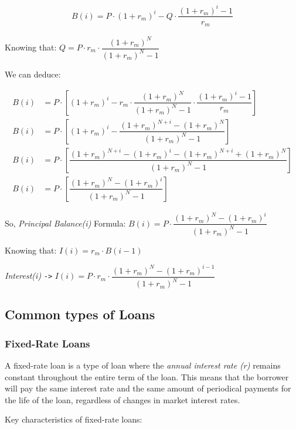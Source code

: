 \documentclass{article}
\begin{document}
\begin{align*}
B(i) = P \cdot (1+r_m)^i - Q \cdot \dfrac{(1+r_m)^i - 1}{r_m}
\end{align*}

Knowing that: $Q = P \cdot r_m \cdot \dfrac{(1+r_m)^N}{(1+r_m)^N-1}$

We can deduce:

\begin{align*}
B(i) &= P \cdot \left[(1+r_m)^i - r_m \cdot \dfrac{(1+r_m)^N}{(1+r_m)^N -1} \cdot
\dfrac{(1+r_m)^i -1}{r_m} \right] \\
B(i) &= P \cdot \left[(1+r_m)^i - \dfrac{(1+r_m)^{N+i} - (1+r_m)^N}{(1+r_m)^N -1} \right] \\
B(i) &= P \cdot \left[\dfrac{(1+r_m)^{N+i} -(1+r_m)^i - (1+r_m)^{N+i} + (1+r_m)^N}{(1+r_m)^N -1} \right] \\
B(i) &= P \cdot \left[\dfrac{(1+r_m)^N  - (1+r_m)^i}{(1+r_m)^N -1} \right]
\end{align*}

So, \textit{Principal Balance(i)} Formula: $B(i) = P \cdot \dfrac{(1+r_m)^N  - (1+r_m)^i}{(1+r_m)^N -1}$

Knowing that: $I(i) = r_m \cdot B(i-1)$

\textit{Interest(i)} \verb|->| $I(i) = P \cdot r_m \cdot \dfrac{(1+r_m)^N - (1+r_m)^{i-1}}{(1+r_m)^N -1}$

\subsection{Common types of Loans}

\subsubsection{Fixed-Rate Loans}
A fixed-rate loan is a type of loan where the \textit{annual interest rate (r)} remains constant throughout the entire term of the loan. This means that the borrower will pay the same interest rate and the same amount of periodical payments for the life of the loan, regardless of changes in market interest rates.

Key characteristics of fixed-rate loans:
\end{document}
